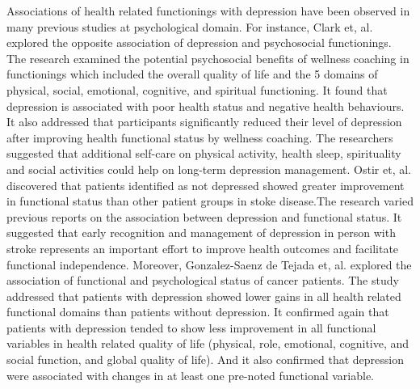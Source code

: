 \documentclass[10pt,journal,compsoc]{IEEEtran}
\begin{document}
Associations of health related functionings with depression have been observed in many previous studies at psychological domain. For instance, Clark et, al. \cite{Clark} explored the opposite association of depression and psychosocial functionings. The research examined the potential psychosocial benefits of wellness coaching in functionings which included the overall quality of life and the 5 domains of physical, social, emotional, cognitive, and spiritual functioning. It found that depression is associated with poor health status and negative health behaviours. It also addressed that participants significantly reduced their level of depression after improving health functional status by wellness coaching. The researchers suggested that additional self-care on physical activity, health sleep, spirituality and social activities could help on long-term depression management. Ostir et, al. \cite{Ostir} discovered that patients identified as not depressed showed greater improvement in functional status than other patient groups in stoke disease.The research varied previous reports on the association between depression and functional status. It suggested that early recognition and management of depression in person with stroke represents an important effort to improve health outcomes and facilitate functional independence. Moreover, Gonzalez-Saenz de Tejada et, al. \cite{Gonzalez-Saenz} explored the association of functional and psychological status of cancer patients. The study addressed that patients with depression showed lower gains in all health related functional domains than patients without depression. It confirmed again that patients with depression tended to show less improvement in all functional variables in health related quality of life (physical, role, emotional, cognitive, and social function, and global quality of life). And it also confirmed that depression were associated with changes in at least one pre-noted functional variable.
\end{document}
